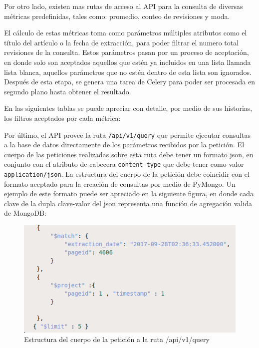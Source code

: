 Por otro lado, existen mas rutas de acceso al API para la consulta de diversas métricas predefinidas, tales como: promedio, conteo de revisiones y moda.

El cálculo de estas métricas toma como parámetros múltiples atributos
como el título del artículo o la fecha de extracción, para poder filtrar el numero total revisiones de la consulta.
Estos parámetros pasan por un proceso de aceptación, en donde solo son aceptados aquellos que estén ya incluidos en una lista llamada lista blanca, aquellos parámetros que no estén dentro de esta lista son ignorados.
Después de esta etapa, se genera una tarea de Celery para poder ser procesada en segundo plano hasta obtener el resultado.

En las siguientes tablas se puede apreciar con detalle, por medio de sus historias, los filtros aceptados por cada métrica:



Por último, el API provee la ruta \texttt{/api/v1/query} que permite ejecutar consultas a la base de datos directamente de los parámetros recibidos por la petición.
El cuerpo de las peticiones realizadas sobre esta ruta debe tener un formato json, en conjunto con el atributo de cabecera
\texttt{content-type} que debe tener como valor \texttt{application/json}.
La estructura del cuerpo de la petición debe coincidir con el formato aceptado para la creación de consultas por medio de PyMongo.
Un ejemplo de este formato puede ser apreciado en la siguiente figura, en donde cada clave de la dupla clave-valor del json representa una función de agregación valida de MongoDB:

\begin{figure}[H]
	\centering
		\includegraphics[width=1\textwidth]{figures/query_body_format}
	\caption{Estructura del cuerpo de la petición a la ruta /api/v1/query}
	\label{fig:query_body_format}
\end{figure}

